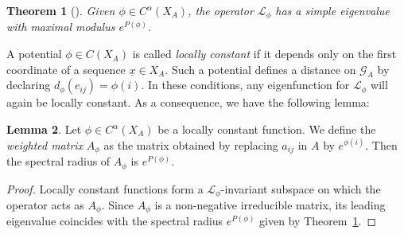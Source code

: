 \documentclass{amsart}
\newtheorem{thm}{Theorem}[section]
\theoremstyle{remark}
\theoremstyle{definition}
\newtheorem{lem}[thm]{Lemma}
\begin{document}
\begin{thm}[{\cite[Theorem 3.5]{parry1990zeta}}]
   \label{thm:parry}
 Given $\phi \in C^\alpha (X_A)$, the operator $\mathcal{L}_\phi$ has a simple eigenvalue with maximal modulus $e^{P(\phi)}$.
\end{thm}

A potential $\phi \in C(X_A)$ is called \emph{locally constant} if it depends only on the first coordinate of a sequence $\underline{x} \in X_A$. Such a potential defines a distance on $\mathcal{G}_A$ by declaring $d_\phi (e_{ij}) = \phi (i)$.
In these conditions, any eigenfunction for $\mathcal{L}_\phi$ will again be locally constant.
As a consequence, we have the following lemma:

\begin{lem}
\label{lemma:locallyconstant}
Let $\phi \in C^{\alpha}(X_A)$ be a locally constant function. We define the \emph{weighted matrix} $A_\phi$ as the matrix obtained by replacing $a_{ij}$ in $A$ by $e^{\phi(i)}$. Then the spectral radius of $A_\phi$ is $e^{P(\phi)}$.
\end{lem}
\begin{proof}
Locally constant functions form a $\mathcal{L}_\phi$-invariant subspace on which the operator acts as $A_\phi$. Since $A_\phi$ is a non-negative irreducible matrix, its leading eigenvalue coincides with the spectral radius $e^{P(\phi)}$ given by Theorem~\ref{thm:parry}.
\end{proof}

\printbibliography
\end{document}
